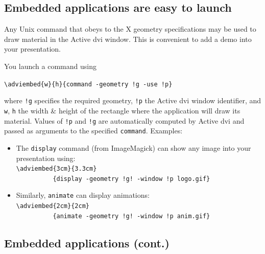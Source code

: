 \documentclass[12pt]{article}
\begin{document}
\newpage

\subsection* {Embedded applications are easy to launch}

Any Unix command that obeys to the X geometry specifications may be
used to draw material in the Active dvi window.
This is convenient to add a demo into your presentation.

\bigskip

\noindent
You launch a command using

\verb+\adviembed{w}{h}{command -geometry !g -use !p}+

\noindent
where \verb"!g" specifies the required geometry, \verb"!p" the Active dvi
window identifier, and \verb"w", \verb"h" the width \& height of the
rectangle where the application will draw its material.
Values of \verb"!p" and \verb"!g" are automatically computed by Active
dvi and passed as arguments to the specified \verb"command".
 Examples:

\begin{itemize}
\item The \verb"display" command (from ImageMagick) can show any image into your
presentation using:\\
\verb|\adviembed{3cm}{3.3cm}|\\
\verb|          {display -geometry !g! -window !p logo.gif}|\\

\item Similarly, \verb|animate| can display animations:\\
        \verb|\adviembed{2cm}{2cm}|\\
        \verb|          {animate -geometry !g! -window !p anim.gif}|\\
\end{itemize}

% 
% 


\newpage

\subsection* {Embedded applications (cont.)}
\end{document}
